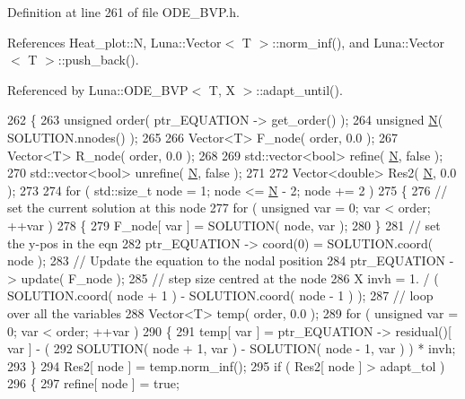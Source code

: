 Definition at line 261 of file O\+D\+E\+\_\+\+B\+V\+P.\+h.



References Heat\+\_\+plot\+::N, Luna\+::\+Vector$<$ T $>$\+::norm\+\_\+inf(), and Luna\+::\+Vector$<$ T $>$\+::push\+\_\+back().



Referenced by Luna\+::\+O\+D\+E\+\_\+\+B\+V\+P$<$ T, X $>$\+::adapt\+\_\+until().


\begin{DoxyCode}
262   \{
263     \textcolor{keywordtype}{unsigned} order( ptr\_EQUATION -> get\_order() );
264     \textcolor{keywordtype}{unsigned} \hyperlink{namespaceHeat__plot_a7d050092798e28458a263710837bda77}{N}( SOLUTION.nnodes() );
265 
266     Vector<T> F\_node( order, 0.0 );
267     Vector<T> R\_node( order, 0.0 );
268 
269     std::vector<bool> refine( \hyperlink{namespaceHeat__plot_a7d050092798e28458a263710837bda77}{N}, \textcolor{keyword}{false} );
270     std::vector<bool> unrefine( \hyperlink{namespaceHeat__plot_a7d050092798e28458a263710837bda77}{N}, \textcolor{keyword}{false} );
271 
272     Vector<double> Res2( \hyperlink{namespaceHeat__plot_a7d050092798e28458a263710837bda77}{N}, 0.0 );
273 
274     \textcolor{keywordflow}{for} ( std::size\_t node = 1; node <= \hyperlink{namespaceHeat__plot_a7d050092798e28458a263710837bda77}{N} - 2; node += 2 )
275     \{
276       \textcolor{comment}{// set the current solution at this node}
277       \textcolor{keywordflow}{for} ( \textcolor{keywordtype}{unsigned} var = 0; var < order; ++var )
278       \{
279          F\_node[ var ] = SOLUTION( node, var );
280       \}
281       \textcolor{comment}{// set the y-pos in the eqn}
282       ptr\_EQUATION -> coord(0) = SOLUTION.coord( node );
283       \textcolor{comment}{// Update the equation to the nodal position}
284       ptr\_EQUATION -> update( F\_node );
285       \textcolor{comment}{// step size centred at the node}
286       X invh = 1. / ( SOLUTION.coord( node + 1 ) - SOLUTION.coord( node - 1 ) );
287       \textcolor{comment}{// loop over all the variables}
288       Vector<T> temp( order, 0.0 );
289       \textcolor{keywordflow}{for} ( \textcolor{keywordtype}{unsigned} var = 0; var < order; ++var )
290       \{
291         temp[ var ] = ptr\_EQUATION -> residual()[ var ] - (
292                 SOLUTION( node + 1, var ) - SOLUTION( node - 1, var ) ) * invh;
293       \}
294       Res2[ node ] = temp.norm\_inf();
295       \textcolor{keywordflow}{if} ( Res2[ node ] > adapt\_tol )
296       \{
297         refine[ node ] = \textcolor{keyword}{true};

\end{DoxyCode}
